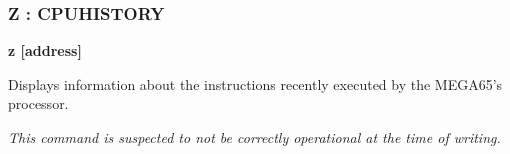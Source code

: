 \subsubsection{Z : CPUHISTORY}
\begin{description}[leftmargin=2cm,style=nextline]
\item [Format:] {\bf z [address]}
\item [Usage:] Displays information about the instructions recently executed by
  the MEGA65's processor.

\item [Remarks:] {\em This command is suspected to not be correctly operational at
  the time of writing.}

\end{description}



  
